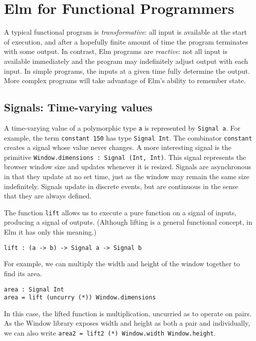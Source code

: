 \documentclass{article}
\begin{document}
\section{Elm for Functional
Programmers}\label{elm-for-functional-programmers}

A typical functional program is \emph{transformative}: all input is
available at the start of execution, and after a hopefully finite amount
of time the program terminates with some output. In contrast, Elm
programs are \emph{reactive}: not all input is available immediately and
the program may indefinitely adjust output with each input. In simple
programs, the inputs at a given time fully determine the output. More
complex programs will take advantage of Elm's ability to remember state.

\subsection{Signals: Time-varying
values}\label{signals-time-varying-values}

A time-varying value of a polymorphic type \texttt{a} is represented by
\texttt{Signal a}. For example, the term \texttt{constant 150} has type
\texttt{Signal Int}. The combinator \texttt{constant} creates a signal
whose value never changes. A more interesting signal is the primitive
\texttt{Window.dimensions : Signal (Int, Int)}. This signal represents
the browser window size and updates whenever it is resized. Signals are
asynchronous in that they update at no set time, just as the window may
remain the same size indefinitely. Signals update in discrete events, but
are continuous in the sense that they are always defined.

The function \texttt{lift} allows us to execute a pure function on a
signal of inputs, producing a signal of outputs. (Although lifting is a
general functional concept, in Elm it has only this meaning.)

\begin{verbatim}
lift : (a -> b) -> Signal a -> Signal b
\end{verbatim}

For example, we can multiply the width and height of the window together
to find its area.

\begin{verbatim}
area : Signal Int
area = lift (uncurry (*)) Window.dimensions
\end{verbatim}

In this case, the lifted function is multiplication, uncurried as to
operate on pairs. As the Window library exposes width and height as both
a pair and individually, we can also write
\texttt{area2 = lift2 (*) Window.width Window.height}.
\end{document}
